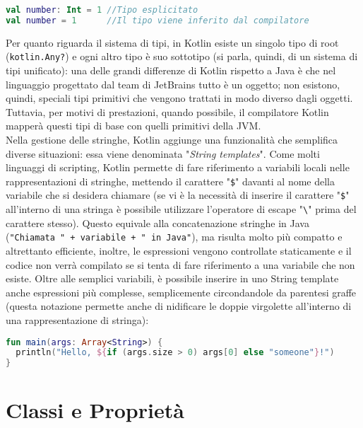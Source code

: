 \begin{lstlisting}[caption={Inferenza di tipo}, captionpos=b, label={lst:exampleInferenzaDiTipo}, language=Kotlin]
val number: Int = 1 //Tipo esplicitato
val number = 1      //Il tipo viene inferito dal compilatore
\end{lstlisting}

Per quanto riguarda il sistema di tipi, in Kotlin esiste un singolo tipo di root (\texttt{kotlin.Any?}) e ogni altro tipo è suo sottotipo (si parla, quindi, di un sistema di tipi unificato): una delle grandi differenze di Kotlin rispetto a Java è che nel linguaggio progettato dal team di JetBrains tutto è un oggetto; non esistono, quindi, speciali tipi primitivi che vengono trattati in modo diverso dagli oggetti. Tuttavia, per motivi di prestazioni, quando possibile, il compilatore Kotlin mapperà questi tipi di base con quelli primitivi della JVM.\\

Nella gestione delle stringhe, Kotlin aggiunge una funzionalità che semplifica diverse situazioni: essa viene denominata "{\em String templates}". Come molti linguaggi di scripting, Kotlin permette di fare riferimento a variabili locali nelle rappresentazioni di stringhe, mettendo il carattere "\texttt{\$}" davanti al nome della variabile che si desidera chiamare (se vi è la necessità di inserire il carattere "\texttt{\$}" all’interno di una stringa è possibile utilizzare l’operatore di escape "\texttt{\textbackslash}" prima del carattere stesso). Questo equivale alla concatenazione stringhe in Java (\texttt{"Chiamata " + variabile + " in Java"}), ma risulta molto più compatto e altrettanto efficiente, inoltre, le espressioni vengono controllate staticamente e il codice non verrà compilato se si tenta di fare riferimento a una variabile che non esiste. Oltre alle semplici variabili, è possibile inserire in uno String template anche espressioni più complesse, semplicemente circondandole da parentesi graffe (questa notazione permette anche di nidificare le doppie virgolette all'interno di una rappresentazione di stringa):\\

\begin{lstlisting}[caption={String Template all'interno di una \texttt{println}}, captionpos=b, label={lst:exampleStringTemplate}, language=Kotlin]
fun main(args: Array<String>) {
  println("Hello, ${if (args.size > 0) args[0] else "someone"}!")
}
\end{lstlisting}

\section{Classi e Proprietà}

